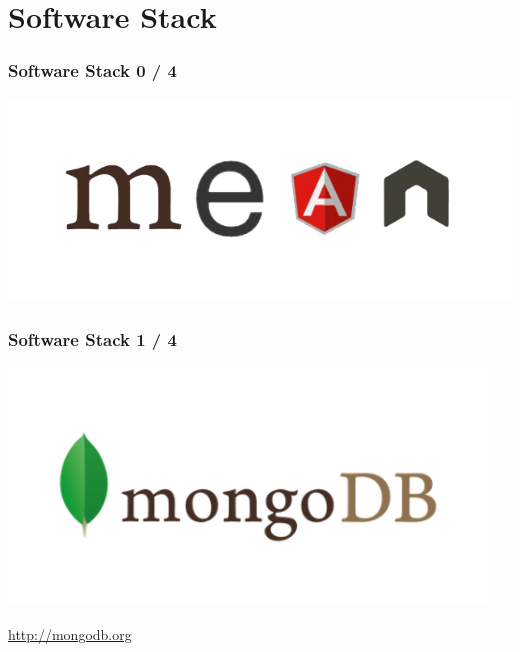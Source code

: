 \documentclass[10pt, compress]{beamer}
\begin{document}
\section{Software Stack}

\begin{frame}[fragile]

  \frametitle{Software Stack 0 / 4}

  \begin{center}
    \includegraphics[width=\textwidth]{images/mean}
  \end{center}

\end{frame}

\begin{frame}[fragile]

  \frametitle{Software Stack 1 / 4}

  \begin{center}
    \includegraphics[width=0.95\textwidth]{images/mongodb}

    \url{http://mongodb.org}
  \end{center}

\end{frame}
\end{document}
